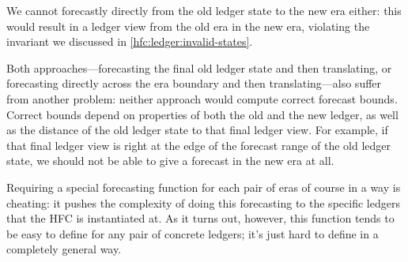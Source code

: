 We cannot forecastly directly from the old ledger state to the new era either:
this would result in a ledger view from the old era in the new era, violating
the invariant we discussed in \cref{hfc:ledger:invalid-states}.

Both approaches---forecasting the final old ledger state and then translating,
or forecasting directly across the era boundary and then translating---also
suffer from another problem: neither approach would compute correct forecast
bounds. Correct bounds depend on properties of both the old and the new ledger,
as well as the distance of the old ledger state to that final ledger view. For
example, if that final ledger view is right at the edge of the forecast range of
the old ledger state, we should not be able to give a forecast in the new era at
all.

Requiring a special forecasting function for each pair of eras of course in a
way is cheating: it pushes the complexity of doing this forecasting to the
specific ledgers that the HFC is instantiated at. As it turns out, however, this
function tends to be easy to define for any pair of concrete ledgers; it's just
hard to define in a completely general way.
